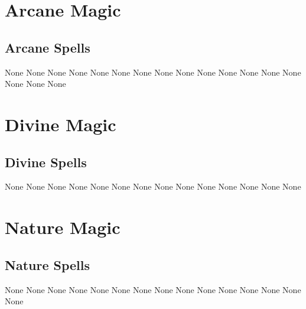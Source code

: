 \small
\section{Arcane Magic}\label{Arcane Magic}
\subsection{Arcane Spells}\label{Arcane Spells}
\begin{spelllist}
 None
 None
 None
 None
 None
 None
 None
 None
 None
 None
 None
 None
 None
 None
 None
 None
 None
\end{spelllist}
\small
\section{Divine Magic}\label{Divine Magic}
\subsection{Divine Spells}\label{Divine Spells}
\begin{spelllist}
 None
 None
 None
 None
 None
 None
 None
 None
 None
 None
 None
 None
 None
 None
\end{spelllist}
\small
\section{Nature Magic}\label{Nature Magic}
\subsection{Nature Spells}\label{Nature Spells}
\begin{spelllist}
 None
 None
 None
 None
 None
 None
 None
 None
 None
 None
 None
 None
 None
 None
 None
\end{spelllist}